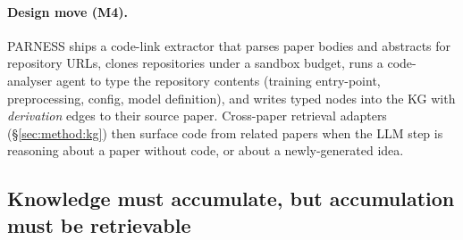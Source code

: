 \documentclass{article}
\newcommand{\parness}{\textsf{PARNESS}}
\begin{document}
\paragraph{Design move (M4).} \parness{} ships a code-link extractor
that parses paper bodies and abstracts for repository URLs, clones
repositories under a sandbox budget, runs a code-analyser agent
to type the repository contents (training entry-point, preprocessing,
config, model definition), and writes typed nodes into the KG with
\emph{derivation} edges to their source paper. Cross-paper retrieval
adapters (\S\ref{sec:method:kg}) then surface code from related papers
when the LLM step is reasoning about a paper without code, or about a
newly-generated idea.

\subsection{Knowledge must accumulate, but accumulation must be retrievable}
\label{sec:m5}
\end{document}
